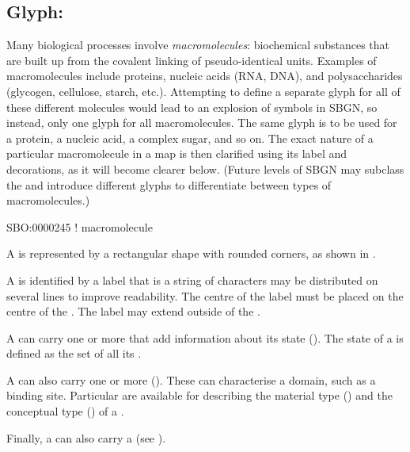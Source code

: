 \subsection{Glyph: }
\label{sec:macromolecule}

Many biological processes involve \emph{macromolecules}: biochemical substances that are built up from the covalent linking of pseudo-identical units.
Examples of macromolecules include proteins, nucleic acids (RNA, DNA), and polysaccharides (glycogen, cellulose, starch, etc.).
Attempting to define a separate glyph for all of these different molecules would lead to an explosion of symbols in SBGN, so instead, \SBGNPDLone {} only one glyph for all macromolecules.
The same glyph is to be used for a protein, a nucleic acid, a complex sugar, and so on.
The exact nature of a particular macromolecule in a map is then clarified using its label and decorations, as it will become clearer below.
(Future levels of SBGN may subclass the  and introduce different glyphs to differentiate between types of macromolecules.)

\begin{glyphDescription}

\glyphSboTerm
SBO:0000245 ! macromolecule



\glyphContainer
A  is represented by a rectangular shape with rounded corners, as shown in .

\glyphLabel
A  is identified by a label  that is a string of characters  may be distributed on several lines to improve readability.
The centre of the label must be placed on the centre of the .
The label may extend outside of the .

\glyphAux
A  can carry one or more  that add information about its state ().
The state of a  is defined as the set of all its .

A  can also carry one or more  ().
These can characterise a domain, such as a binding site.
Particular  are available for describing the material type () and the conceptual type () of a .

Finally, a  can also carry a  (see ).

\end{glyphDescription}

